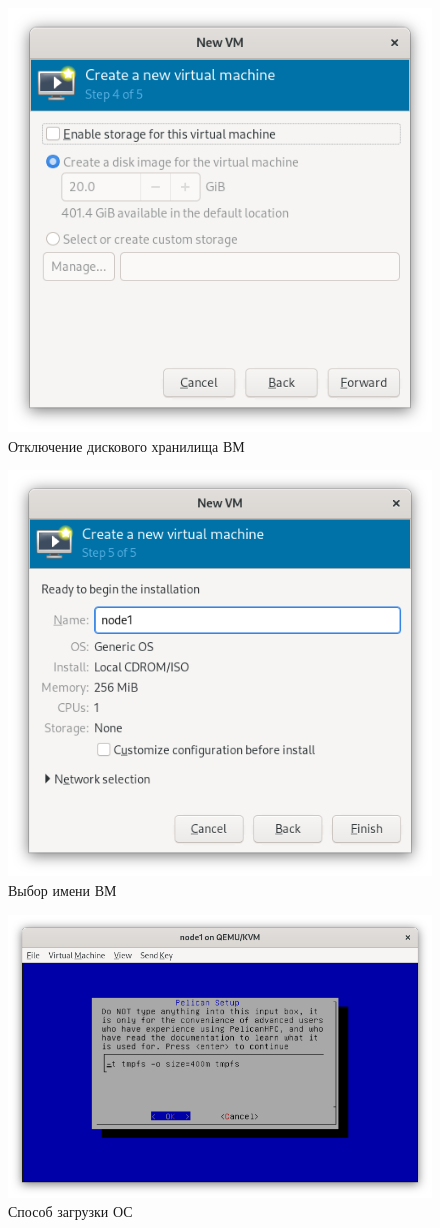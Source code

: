 \begin{figure}[H]
	\centering
	\includegraphics[width=0.5\linewidth]{1-03}
	\caption{Отключение дискового хранилища ВМ}
	\label{init/03}
\end{figure}

\begin{figure}[H]
	\centering
	\includegraphics[width=0.5\linewidth]{1-04}
	\caption{Выбор имени ВМ}
	\label{init/04}
\end{figure}

\begin{figure}[H]
	\centering
	\includegraphics[width=0.7\linewidth]{1-05}
	\caption{Способ загрузки ОС}
	\label{init/05}
\end{figure}

